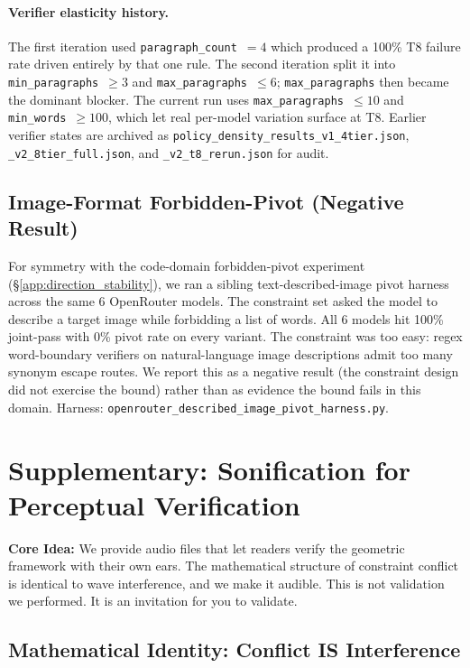 \documentclass{article}
\theoremstyle{plain}
\theoremstyle{definition}
\theoremstyle{remark}
\begin{document}
\paragraph{Verifier elasticity history.} The first iteration used \texttt{paragraph\_count}~$=4$ which produced a 100\% T8 failure rate driven entirely by that one rule. The second iteration split it into \texttt{min\_paragraphs}~$\geq 3$ and \texttt{max\_paragraphs}~$\leq 6$; \texttt{max\_paragraphs} then became the dominant blocker. The current run uses \texttt{max\_paragraphs}~$\leq 10$ and \texttt{min\_words}~$\geq 100$, which let real per-model variation surface at T8. Earlier verifier states are archived as \texttt{policy\_density\_results\_v1\_4tier.json}, \texttt{\_v2\_8tier\_full.json}, and \texttt{\_v2\_t8\_rerun.json} for audit.

\subsection{Image-Format Forbidden-Pivot (Negative Result)}\label{app:image_pivot}

For symmetry with the code-domain forbidden-pivot experiment (\S\ref{app:direction_stability}), we ran a sibling text-described-image pivot harness across the same 6 OpenRouter models. The constraint set asked the model to describe a target image while forbidding a list of words. All 6 models hit 100\% joint-pass with 0\% pivot rate on every variant. The constraint was too easy: regex word-boundary verifiers on natural-language image descriptions admit too many synonym escape routes. We report this as a negative result (the constraint design did not exercise the bound) rather than as evidence the bound fails in this domain. Harness: \texttt{openrouter\_described\_image\_pivot\_harness.py}.

\section{Supplementary: Sonification for Perceptual Verification}\label{app:sonification}

\textbf{Core Idea:} We provide audio files that let readers verify the geometric framework with their own ears. The mathematical structure of constraint conflict is identical to wave interference, and we make it audible. This is not validation we performed. It is an invitation for you to validate.

\subsection{Mathematical Identity: Conflict IS Interference}
\end{document}
